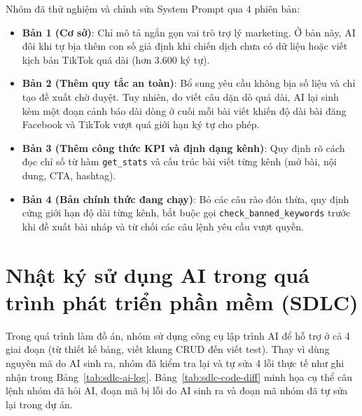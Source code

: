 Nhóm đã thử nghiệm và chỉnh sửa System Prompt qua 4 phiên bản:
\begin{itemize}[noitemsep,topsep=2pt]
 \item \textbf{Bản 1 (Cơ sở)}: Chỉ mô tả ngắn gọn vai trò trợ lý marketing. Ở bản này, AI đôi khi tự bịa thêm con số giả định khi chiến dịch chưa có dữ liệu hoặc viết kịch bản TikTok quá dài (hơn 3.600 ký tự).
 \item \textbf{Bản 2 (Thêm quy tắc an toàn)}: Bổ sung yêu cầu không bịa số liệu và chỉ tạo đề xuất chờ duyệt. Tuy nhiên, do viết câu dặn dò quá dài, AI lại sinh kèm một đoạn cảnh báo dài dòng ở cuối mỗi bài viết khiến độ dài bài đăng Facebook và TikTok vượt quá giới hạn ký tự cho phép.
 \item \textbf{Bản 3 (Thêm công thức KPI và định dạng kênh)}: Quy định rõ cách đọc chỉ số từ hàm \texttt{get\_stats} và cấu trúc bài viết từng kênh (mở bài, nội dung, CTA, hashtag).
 \item \textbf{Bản 4 (Bản chính thức đang chạy)}: Bỏ các câu rào đón thừa, quy định cứng giới hạn độ dài từng kênh, bắt buộc gọi \texttt{check\_banned\_keywords} trước khi đề xuất bài nháp và từ chối các câu lệnh yêu cầu vượt quyền.
\end{itemize}

\section{Nhật ký sử dụng AI trong quá trình phát triển phần mềm (SDLC)}

Trong quá trình làm đồ án, nhóm sử dụng công cụ lập trình AI để hỗ trợ ở cả 4 giai đoạn (từ thiết kế bảng, viết khung CRUD đến viết test). Thay vì dùng nguyên mã do AI sinh ra, nhóm đã kiểm tra lại và tự sửa 4 lỗi thực tế như ghi nhận trong Bảng~\ref{tab:sdlc-ai-log}. Bảng~\ref{tab:sdlc-code-diff} minh họa cụ thể câu lệnh nhóm đã hỏi AI, đoạn mã bị lỗi do AI sinh ra và đoạn mã nhóm đã tự sửa lại trong dự án.

